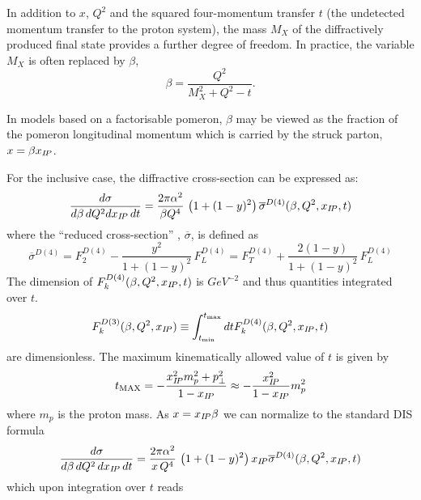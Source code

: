 In addition to $x$, $Q^2$ and the squared four-momentum transfer $t$
(the undetected momentum transfer to the proton system),
the mass $M_X$ of the diffractively produced final state provides
 a further degree of freedom. In practice, the variable $M_X$ is often replaced by $\beta$,
\begin{equation}
\beta=\frac{Q^2}{M_X^2+Q^2-t}.
\end{equation}

In models based on a factorisable pomeron, $\beta$ may be viewed as the fraction of the
pomeron longitudinal momentum which is carried by the struck parton, $x=\beta x_{{I\!P}}$.

For the inclusive case, the diffractive cross-section can be expressed as:
\begin{equation}
  \frac{d\sigma}{d\beta\,dQ^2dx_{{I\!P}}\,dt}
=
  \frac{2\pi\alpha^2}{\beta Q^4}\,
    \left( 1 +  (1-y)^2 \right) \overline\sigma^{D(4)}(\beta,Q^2,x_{{I\!P}},t)
\label{Dxs}
\end{equation}
where the ``reduced cross-section'' , $\overline\sigma$, is defined as
\begin{equation}
\overline\sigma^{D(4)}
 = F_2^{D(4)} - \frac{y^2}{1 +  (1-y)^2}\, F_L^{D(4)}
 = F_T^{D(4)} + \frac{2(1-y)}{1 +  (1-y)^2}\, F_L^{D(4)}
\label{eq:sigred}
\end{equation}
The dimension of $F_k^{D(4)}(\beta,Q^2,x_{{I\!P}},t)$
is $GeV^{-2}$ and thus quantities integrated over $t$.
\begin{equation}
F_k^{D(3)}(\beta,Q^2,x_{{I\!P}})
\equiv
\int_{t_{\rm min}}^{t_{\rm max}} dt
F_k^{D(4)}(\beta,Q^2,x_{{I\!P}},t)
\end{equation}
are dimensionless. The maximum kinematically allowed value of $t$ is given by
\begin{equation}
t_{\rm MAX} 
=
-\frac{x_{{I\!P}}^2 m_p^2 + p_\perp^2}{1-x_{{I\!P}}}
\approx 
-\frac{x_{{I\!P}}^2}{1-x_{{I\!P}}} m_p^2
\end{equation}
where $m_p$ is the proton mass.
As $x = x_{{I\!P}}\beta$ we can normalize to the standard DIS formula
\begin{equation}
\frac{d\sigma}{d\beta\,dQ^2\,dx_{{I\!P}}\,dt} =
  \frac{2\pi\alpha^2}{x\, Q^4}\,
    \left( 1 +  (1-y)^2 \right) x_{{I\!P}}\overline\sigma^{D(4)}(\beta,Q^2,x_{{I\!P}},t)
\end{equation}
which upon integration over $t$ reads
